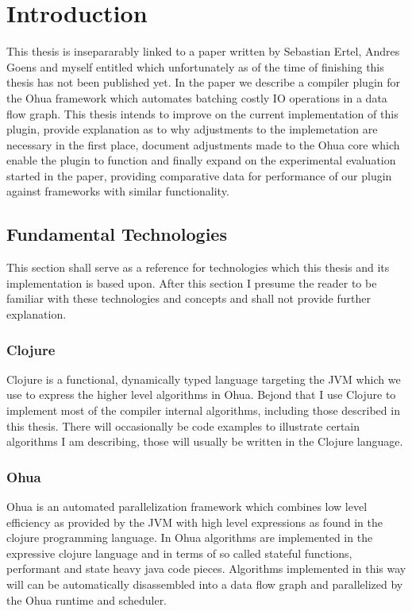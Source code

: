 
\chapter{Introduction} %

\label{ChapterIntro} %


This thesis is insepararably linked to a paper written by Sebastian Ertel, Andres Goens and myself entitled \yauhauPaperTitle{} which unfortunately as of the time of finishing this thesis has not been published yet.
In the paper we describe a compiler plugin for the Ohua framework which automates batching costly IO operations in a data flow graph.
This thesis intends to improve on the current implementation of this plugin, provide explanation as to why adjustments to the implemetation are necessary in the first place, document adjustments made to the Ohua core which enable the plugin to function and finally expand on the experimental evaluation started in the paper, providing comparative data for performance of our plugin against frameworks with similar functionality.

\section{Fundamental Technologies}

This section shall serve as a reference for technologies which this thesis and its implementation is based upon.
After this section I presume the reader to be familiar with these technologies and concepts and shall not provide further explanation.

\subsection{Clojure}

Clojure is a functional, dynamically typed language targeting the JVM  which we use to express the higher level algorithms in Ohua.
Bejond that I use Clojure to implement most of the compiler internal algorithms, including those described in this thesis.
There will occasionally be code examples to illustrate certain algorithms I am describing, those will usually be written in the Clojure language.

\subsection{Ohua}

Ohua is an automated parallelization framework which combines low level efficiency as provided by the JVM with high level expressions as found in the clojure programming language.
In Ohua algorithms are implemented in the expressive clojure language and in terms of so called stateful functions, performant and state heavy java code pieces.
Algorithms implemented in this way will can be automatically disassembled into a data flow graph and parallelized by the Ohua runtime and scheduler.
